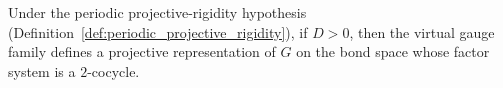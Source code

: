 \begin{lemma}%
    \label{thm:projectiveRep_of_symmetry}
    \leanok
    Under the periodic projective-rigidity hypothesis
    (Definition~\ref{def:periodic_projective_rigidity}), if $D>0$, then the
    virtual gauge family defines a projective representation of $G$ on the bond
    space whose factor system is a $2$-cocycle.
\end{lemma}
